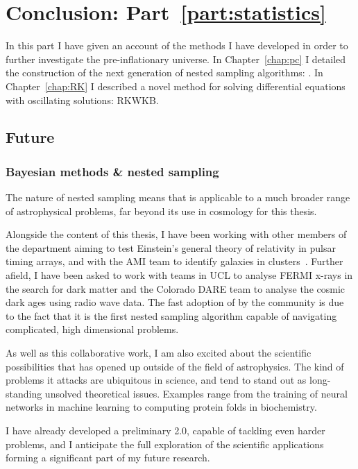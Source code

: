 \chapter*{Conclusion: Part~\ref{part:statistics}}


In this part I have given an account of the methods I have developed in order to further investigate the pre-inflationary universe. In Chapter~\ref{chap:pc} I detailed the construction of the next generation of nested sampling algorithms: \PolyChord{}. In Chapter~\ref{chap:RK} I described a novel method for solving differential equations with oscillating solutions: RKWKB\@.

\section*{Future}
\subsection*{Bayesian methods \& nested sampling}
The nature of nested sampling means that \PolyChord{} is applicable to a much broader range of astrophysical problems, far beyond its use in cosmology for this thesis. 

Alongside the content of this thesis, I have been working with other members of the department aiming to test Einstein's general theory of relativity in pulsar timing arrays, and with the AMI team to identify galaxies in clusters~\citep{Rumsey}. Further afield, I have been asked to work with teams in UCL to analyse FERMI x-rays in the search for dark matter and the Colorado DARE team to analyse the cosmic dark ages using radio wave data. The fast adoption of \PolyChord{} by the community is due to the fact that it is the first nested sampling algorithm capable of navigating complicated, high dimensional problems.

As well as this collaborative work, I am also excited about the scientific possibilities that \PolyChord{} has opened up outside of the field of astrophysics. The kind of problems it attacks are ubiquitous in science, and tend to stand out as long-standing unsolved theoretical issues. Examples range from the training of neural networks in machine learning to computing protein folds in biochemistry.

I have already developed a preliminary \PolyChord{} 2.0, capable of tackling even harder problems, and I anticipate the full exploration of the scientific applications forming a significant part of my future research. 

